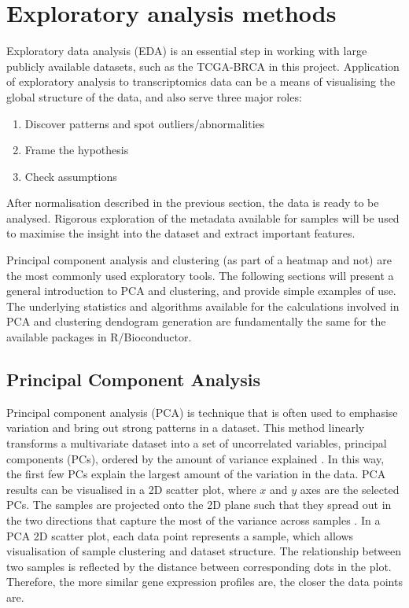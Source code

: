     
             
   
    
    
   
\newpage    
\section{Exploratory analysis methods}
    
    Exploratory data analysis (EDA) is an essential step in working with large publicly available datasets, such as the TCGA-BRCA in this project. Application of exploratory analysis to transcriptomics data can be a means of visualising the global structure of the data, and also serve three major roles: 
    
    \begin{enumerate}
      \item Discover patterns and spot outliers/abnormalities
      \item Frame the hypothesis
      \item Check assumptions 
    \end{enumerate}
    
    After normalisation described in the previous section, the data is ready to be analysed. Rigorous exploration of the metadata available for samples will be used to maximise the insight into the dataset and extract important features.
    
    Principal component analysis and clustering (as part of a heatmap and not) are the most commonly used exploratory tools. The following sections will present a general introduction to PCA and clustering, and provide simple examples of use. The underlying statistics and algorithms available for the calculations involved in PCA and clustering dendogram generation are fundamentally the same for the available packages in R/Bioconductor. 
    
    
    \subsection{Principal Component Analysis}\label{section:pcamethod}
    
    Principal component analysis (PCA) is technique that is often used to emphasise variation and bring out strong patterns in a dataset. This method linearly transforms a multivariate dataset into a set of uncorrelated variables, principal components (PCs), ordered by the amount of variance explained \cite{jolliffe2002principal}. In this way, the first few PCs explain the largest amount of the variation in the data. PCA results can be visualised in a 2D scatter plot, where $x$ and $y$ axes are the selected PCs. The samples are projected onto the 2D plane such that they spread out in the two directions that capture the most of the variance across samples \cite{Love2016RNA-SeqApproved}. 
    In a PCA 2D scatter plot, each data point represents a sample, which allows visualisation of sample clustering and dataset structure.  The relationship between two samples is reflected by the distance between corresponding dots in the plot. Therefore, the more similar gene expression profiles are, the closer the data points are.    
   
